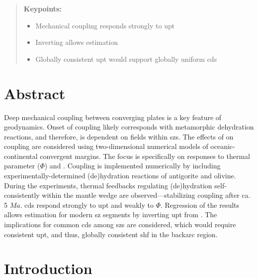
\begin{quote}
\textbf{Keypoints:}

\begin{itemize}
\item
  Mechanical coupling responds strongly to \gls{upt}
\item
  Inverting  allows  estimation
\item
  Globally consistent \gls{upt} would support globally uniform \glspl{cd}
\end{itemize}
\end{quote}

\hypertarget{abstract}{%
\section{Abstract}\label{abstract}}

Deep mechanical coupling between converging plates is a key feature of  geodynamics. Onset of coupling likely corresponds with metamorphic dehydration reactions, and therefore, is dependent on  fields within \glspl{sz}. The effects of  on coupling are considered using two-dimensional numerical models of oceanic-continental convergent margins. The focus is specifically on responses to thermal parameter (\(\Phi\)) and . Coupling is implemented numerically by including experimentally-determined (de)hydration reactions of antigorite and olivine. During the experiments, thermal feedbacks regulating (de)hydration self-consistently within the mantle wedge are observed---stabilizing coupling after ca. 5 \(Ma\). \glspl{cd} respond strongly to \gls{upt} and weakly to \(\Phi\). Regression of the results allows  estimation for modern \gls{sz} segments by inverting \gls{upt} from . The implications for common \glspl{cd} among \glspl{sz} are considered, which would require consistent \gls{upt}, and thus, globally consistent \gls{shf} in the backarc region.

\hypertarget{introduction-1}{%
\section{Introduction}\label{introduction-1}}

